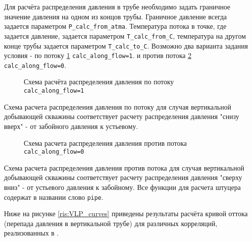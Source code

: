 Для расчёта распределения давления в трубе необходимо задать граничное значение давления на одном из концов трубы. Граничное давление всегда задается параметром  \texttt{P_calc_from_atma}. Температура потока в точке, где задается давление, задается параметром  \texttt{T_calc_from_C}, температура на другом конце трубы задается параметром \texttt{T_calc_to_C}.  Возможно два варианта задания условия - по потоку  \ref{ris:Pipe_scheme_2}  \texttt{calc_along_flow=1}. и против потока  \ref{ris:Pipe_scheme_3} \texttt{calc_along_flow=0}. 

\begin{figure}[h!]
	\begin{center}
				
		\caption{Схема расчёта распределения давления по потоку \texttt{calc_along_flow=1}}
		\label{ris:Pipe_scheme_2}
	\end{center}
\end{figure} 

Схема расчета распределения давления по потоку для случая вертикальной добывающей скважины соответствует расчету распределения давления "снизу вверх" - от забойного давления к устьевому.

\begin{figure}[h!]
	\begin{center}
		
		\caption{Схема расчета распределения давления против потока \texttt{calc_along_flow=0}}
		\label{ris:Pipe_scheme_3}
	\end{center}
\end{figure} 

Схема расчета распределения давления против потока для случая вертикальной добывающей скважины соответствует расчету распределения давления "сверху вниз" - от устьевого давления к забойному.
Все функции для расчета штуцера содержат в названии слово \texttt{pipe}.




Ниже на рисунке \ref{ris:VLP_curves} приведены результаты расчёта кривой оттока (перепада давления в вертикальной трубе) для различных корреляций, реализованных в \unf{}.


